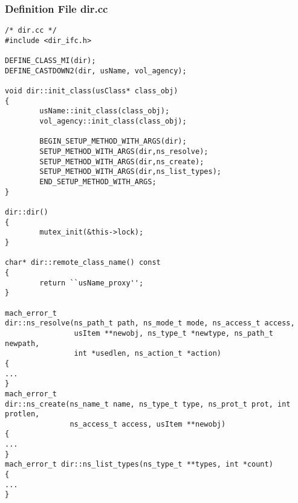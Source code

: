 \subsubsection{Definition File dir.cc}

{\footnotesize
\begin{verbatim}
/* dir.cc */
#include <dir_ifc.h>

DEFINE_CLASS_MI(dir);
DEFINE_CASTDOWN2(dir, usName, vol_agency);

void dir::init_class(usClass* class_obj)
{
        usName::init_class(class_obj);
        vol_agency::init_class(class_obj);

        BEGIN_SETUP_METHOD_WITH_ARGS(dir);
        SETUP_METHOD_WITH_ARGS(dir,ns_resolve);
        SETUP_METHOD_WITH_ARGS(dir,ns_create);
        SETUP_METHOD_WITH_ARGS(dir,ns_list_types);
        END_SETUP_METHOD_WITH_ARGS;
}

dir::dir()
{
        mutex_init(&this->lock);
}

char* dir::remote_class_name() const
{
        return ``usName_proxy'';
}

mach_error_t 
dir::ns_resolve(ns_path_t path, ns_mode_t mode, ns_access_t access, 
                usItem **newobj, ns_type_t *newtype, ns_path_t newpath, 
                int *usedlen, ns_action_t *action)
{
...
}
mach_error_t 
dir::ns_create(ns_name_t name, ns_type_t type, ns_prot_t prot, int protlen, 
               ns_access_t access, usItem **newobj)
{
...
}
mach_error_t dir::ns_list_types(ns_type_t **types, int *count)
{
...
}
\end{verbatim}
}




